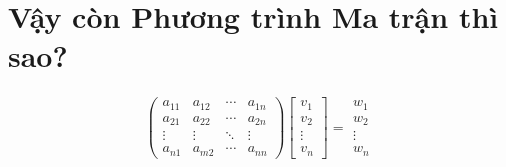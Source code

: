 \documentclass[a4paper,notitlepage]{article}
\begin{document}
	\section{Vậy còn Phương trình Ma trận thì sao?}
	\begin{gather*}
	\begin{pmatrix}
		a_{11} & a_{12} & \cdots & a_{1n} \\
		a_{21} & a_{22} & \cdots & a_{2n} \\
		\vdots & \vdots & \ddots & \vdots \\
		a_{n1} & a_{m2} & \cdots & a_{nn}
	\end{pmatrix}
	\begin{bmatrix}
		v_1 \\ v_2 \\ \vdots \\ v_n 
	\end{bmatrix}
	=
	\begin{array}{c}
		w_1 \\ w_2 \\ \vdots \\ w_n
	\end{array}
	\end{gather*}
	\newpage
\end{document}
